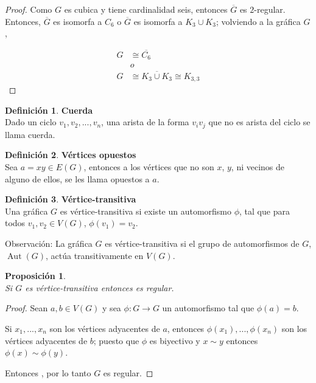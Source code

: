 \documentclass[11pt]{book}
\newtheorem{proposition}{Proposición}
\theoremstyle{definition}
\newtheorem{definition}{Definición}
\DeclareMathOperator{\Aut}{Aut}
\begin{document}
\begin{proof} Como $G$ es cubica y tiene cardinalidad seis, entonces
$\overline{G}$ es $2$-regular. Entonces, $\overline{G}$ es isomorfa a $C_6$ o
$\overline{G}$ es isomorfa a $K_3\cup K_3$; volviendo a la gráfica $G$,

\begin{equation*}
  \begin{split}
    G&\cong \overline{C_6}\\
    &       o\\
    G&\cong \overline{K_3\cup K_3} \cong K_{3,3}
  \end{split}
\end{equation*}
\end{proof}
 

\begin{definition}\textbf{ Cuerda}\\
  Dado un ciclo $v_1, v_2,..., v_n$, una arista de la forma $v_iv_j$
  que no es arista del ciclo se llama cuerda.
\end{definition}



\begin{definition}\textbf{Vértices opuestos}\\
  Sea $a=xy \in E(G)$, entonces a los vértices que no son $x$, $y$, ni
  vecinos de alguno de ellos, se les llama opuestos a $a$.
\end{definition}




\begin{definition}\textbf{Vértice-transitiva}\\
  Una gráfica $G$ es vértice-transitiva si existe un
  automorfismo $\phi$, tal que para todos $v_1, v_2 \in V(G)$,
  $\phi(v_1)= v_2 $.
\end{definition}

Observación: La gráfica $G$ es vértice-transitiva si el grupo de
automorfismos de $G$, $\Aut(G)$, actúa transitivamente en
$V(G)$.

\begin{proposition}\textbf{}\\
  Si $G$ es vértice-transitiva entonces es regular.
\end{proposition}

\begin{proof} Sean $a,b \in V(G)$ y sea $\phi:G\rightarrow G$ un
automorfismo tal que $\phi(a)=b$.

 Si ${x_1,...,x_n}$ son los vértices adyacentes
de $a$, entonces $\phi(x_1),...,\phi(x_n)$ son los vértices adyacentes de $b$;
puesto que $\phi$ es biyectivo y $x\sim y$ entonces $\phi(x)\sim
\phi(y)$.

Entonces , por lo
tanto $G$ es regular.
\end{proof}
\end{document}
